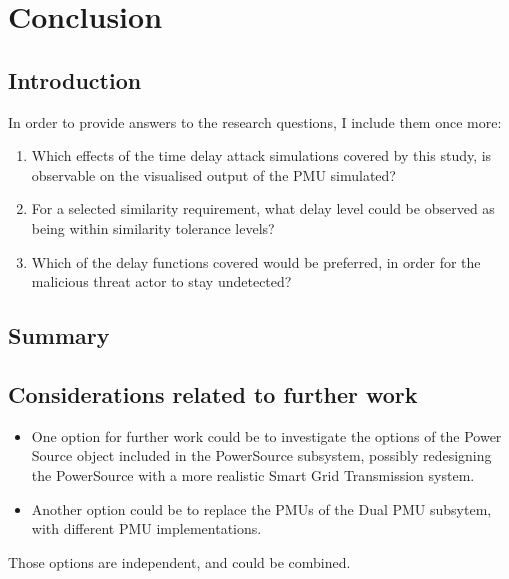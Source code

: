 \chapter{Conclusion}


\section{Introduction}
In order to provide answers to  the research questions, I include them once more: 


\begin{enumerate}
    \item Which effects of the time delay attack simulations covered by this study, is observable on the visualised output of the PMU simulated?
    \item For a selected similarity requirement, what delay level could be observed as being within similarity tolerance levels?
    \item Which of the delay functions covered would be preferred, in order for the malicious threat actor to stay undetected?    

\end{enumerate}



\section{Summary}




\section{Considerations related to further work}
\begin{itemize}
    \item One option for further work could be to investigate the options of the Power Source object included in the PowerSource subsystem, possibly redesigning the PowerSource with a more realistic Smart Grid Transmission system.
\item Another option could be to replace the PMUs of the Dual PMU subsytem, with different PMU implementations.
\end{itemize}


Those options are independent, and could be combined.

